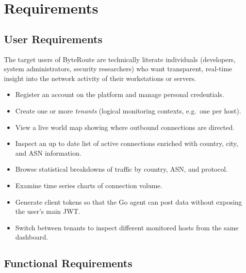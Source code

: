 \documentclass[12pt]{report}
\begin{document}
\chapter{Requirements}
\label{ch:requirements}

\section{User Requirements}

The target users of ByteRoute are technically literate individuals (developers, system
administrators, security researchers) who want transparent, real-time insight into the network
activity of their workstations or servers.

\begin{itemize}
    \item Register an account on the platform and manage personal credentials.
    \item Create one or more \emph{tenants} (logical monitoring contexts, e.g.\ one per host).
    \item View a live world map showing where outbound connections are directed.
    \item Inspect an up to date list of active connections enriched with country, city, and
          ASN information.
    \item Browse statistical breakdowns of traffic by country, ASN, and protocol.
    \item Examine time series charts of connection volume.
    \item Generate client tokens so that the Go agent can post data without
          exposing the user's main JWT.
    \item Switch between tenants to inspect different monitored hosts from the same dashboard.
\end{itemize}

\newpage
\section{Functional Requirements}
\end{document}
